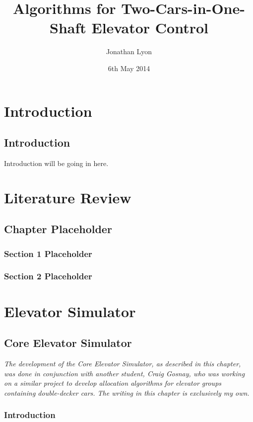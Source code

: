 \documentclass{UoYCSproject}
\author{Jonathan Lyon}
\title{Algorithms for Two-Cars-in-One-Shaft Elevator Control}
\date{6th May 2014}
\begin{document}
\maketitle 

\part{Introduction}

\chapter{Introduction}

Introduction will be going in here.

\part{Literature Review}

\chapter{Chapter Placeholder}

\section{Section 1 Placeholder}
\section{Section 2 Placeholder}

\part{Elevator Simulator}

\chapter{Core Elevator Simulator}
\label{ceschapter}

\textit{The development of the Core Elevator Simulator, as described in this chapter, was done in conjunction with another student, Craig Gosnay, who was working on a similar project to develop allocation algorithms for elevator groups containing double-decker cars.  The writing in this chapter is exclusively my own.}

\section{Introduction}
\end{document}
